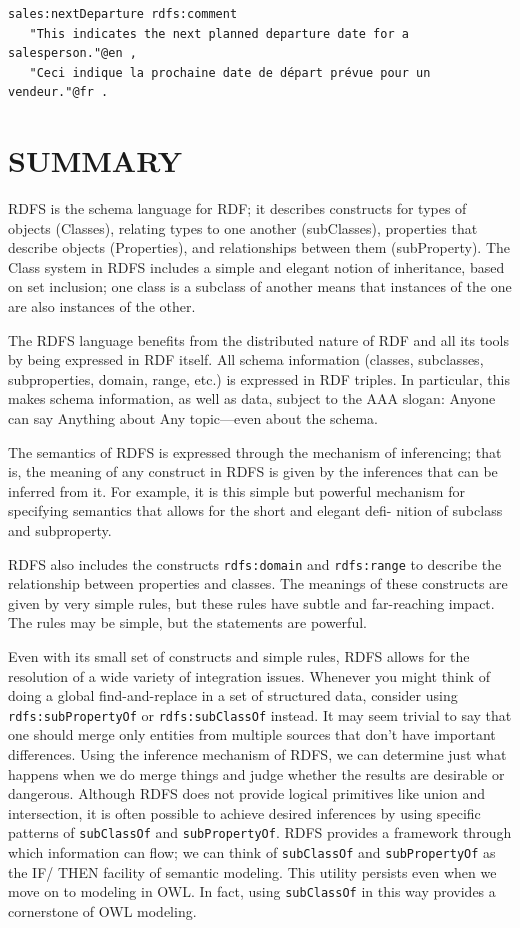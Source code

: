 \begin{lstlisting}
sales:nextDeparture rdfs:comment
   "This indicates the next planned departure date for a salesperson."@en ,
   "Ceci indique la prochaine date de départ prévue pour un vendeur."@fr .
\end{lstlisting}

\section{SUMMARY}

RDFS is the schema language for RDF; it describes constructs for types
of objects (Classes), relating types to one another (subClasses),
properties that describe objects (Properties), and relationships between
them (subProperty). The Class system in RDFS includes a simple and
elegant notion of inheritance, based on set inclusion; one class is a
subclass of another means that instances of the one are also instances
of the other.

The RDFS language benefits from the distributed nature of RDF and all
its tools by being expressed in RDF itself. All schema information
(classes, subclasses, subproperties, domain, range, etc.) is expressed
in RDF triples. In particular, this makes schema information, as well as
data, subject to the AAA slogan: Anyone can say Anything about Any
topic---even about the schema.

The semantics of RDFS is expressed through the mechanism of inferencing;
that is, the meaning of any construct in RDFS is given by the inferences
that can be inferred from it. For example, it is this simple but
powerful mechanism for specifying semantics that allows for the short
and elegant defi- nition of subclass and subproperty.

RDFS also includes the constructs \texttt{rdfs:domain} and \texttt{rdfs:range} to describe
the relationship between properties and classes. The meanings of these
constructs are given by very simple rules, but these rules have subtle
and far-reaching impact. The rules may be simple, but the statements are
powerful.

Even with its small set of constructs and simple rules, RDFS allows for
the resolution of a wide variety of integration issues. Whenever you
might think of doing a global find-and-replace in a set of structured
data, consider using \texttt{rdfs:subPropertyOf} or \texttt{rdfs:subClassOf} instead. It
may seem trivial to say that one should merge only entities from
multiple sources that don't have important differences. Using the
inference mechanism of RDFS, we can determine just what happens when we
do merge things and judge whether the results are desirable or
dangerous. Although RDFS does not provide logical primitives like union
and intersection, it is often possible to achieve desired inferences by
using specific patterns of \texttt{subClassOf} and \texttt{subPropertyOf}. RDFS provides a
framework through which information can flow; we can think of \texttt{subClassOf}
and \texttt{subPropertyOf} as the IF/ THEN facility of semantic modeling. This
utility persists even when we move on to modeling in OWL. In fact, using
\texttt{subClassOf} in this way provides a cornerstone of OWL modeling.

